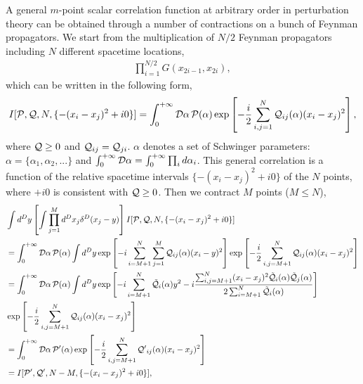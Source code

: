 \documentclass[a4paper,11pt]{article}
\begin{document}
A general $m$-point scalar correlation function at arbitrary order in perturbation theory can be obtained through a number of contractions on a bunch of Feynman propagators. We start from the multiplication of $N/2$ Feynman propagators including $N$ different spacetime locations, 
\begin{align}
\prod_{i=1}^{N/2} G(x_{2 i-1},x_{2 i}),
\end{align}
which can be written in the following form,
\begin{align}\label{eq:gencorre}
I[{\cal P}, {\cal Q}, N, \{-(x_i-x_j)^2+i0\}] = \int_{0}^{+\infty} {\cal D} \alpha \, {\cal P}(\alpha) \exp\left[-\frac{i}{2} \sum_{i,j=1}^{N} {\cal Q}_{ij}(\alpha) (x_i-x_j)^2 \right],
\end{align}
where ${\cal Q} \geq 0$ and ${\cal Q}_{ij}={\cal Q}_{ji}$. $\alpha$ denotes a set of Schwinger parameters: $\alpha=\{\alpha_1,\alpha_2,...\}$ and $\int_{0}^{+\infty} {\cal D} \alpha = \int_{0}^{+\infty} \prod_{i} d \alpha_i$. This general correlation is a function of the relative spacetime intervals $\{-(x_i-x_j)^2+i0\}$ of the $N$ points, where $+i0$ is consistent with ${\cal Q} \geq 0$. Then we contract $M$ points ($M \leq N$),
\begin{align}
&\int d^D y \left[\int \prod_{j=1}^{M} d^D x_j \delta^{D}(x_j-y)\right] I[{\cal P}, {\cal Q}, N, \{-(x_i-x_j)^2+i0\}] \nonumber\\
&= \int_{0}^{+\infty} {\cal D} \alpha \, {\cal P}(\alpha) \int d^D y \exp\left[-i \sum_{i=M+1}^{N} \sum_{j=1}^{M} {\cal Q}_{ij}(\alpha) (x_i-y)^2 \right] \exp\left[-\frac{i}{2} \sum_{i,j=M+1}^{N} {\cal Q}_{ij}(\alpha) (x_i-x_j)^2 \right] \nonumber\\
&= \int_{0}^{+\infty} {\cal D} \alpha \, {\cal P}(\alpha) \int d^D y \exp\left[-i \sum_{i=M+1}^{N}{\cal \tilde{Q}}_{i}(\alpha) y^2 -i \frac{\sum_{i,j=M+1}^{N}(x_i-x_j)^2{\cal \tilde{Q}}_{i}(\alpha){\cal \tilde{Q}}_{j}(\alpha)}{2 \sum_{i=M+1}^{N} {\cal \tilde{Q}}_{i}(\alpha)} \right] \nonumber\\
&\exp\left[-\frac{i}{2} \sum_{i,j=M+1}^{N} {\cal Q}_{ij}(\alpha) (x_i-x_j)^2 \right]\nonumber\\
&=\int_{0}^{+\infty} {\cal D} \alpha \, {\cal P'}(\alpha) \exp\left[-\frac{i}{2} \sum_{i,j=M+1}^{N} {\cal Q'}_{ij}(\alpha) (x_i-x_j)^2 \right]\nonumber\\
&=I[{\cal P'}, {\cal Q'}, N-M, \{-(x_i-x_j)^2+i0\}],
\end{align}
\end{document}
